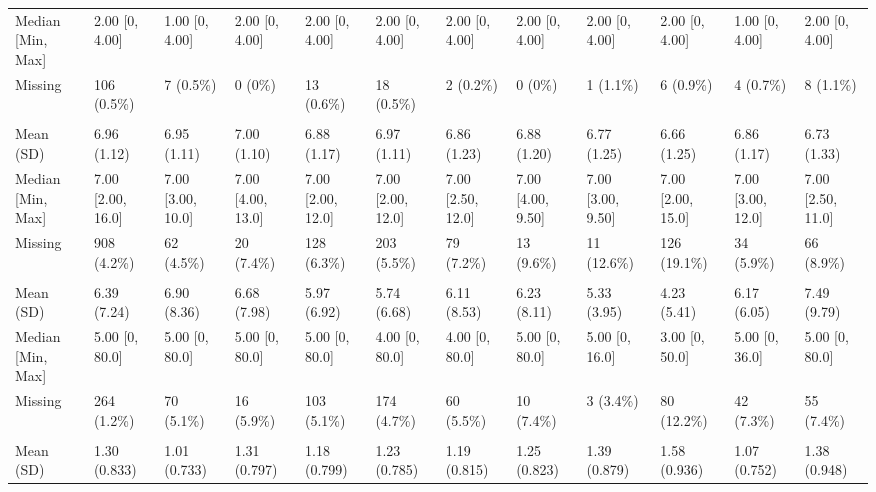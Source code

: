 \documentclass[
  single column]{article}
\begin{document}
\begin{landscape}
\begin{tabular}[t]{llllllllllll}
\hspace{1em}Median [Min, Max] & 2.00 [0, 4.00] & 1.00 [0, 4.00] & 2.00 [0, 4.00] & 2.00 [0, 4.00] & 2.00 [0, 4.00] & 2.00 [0, 4.00] & 2.00 [0, 4.00] & 2.00 [0, 4.00] & 2.00 [0, 4.00] & 1.00 [0, 4.00] & 2.00 [0, 4.00]\\
\hspace{1em}Missing & 106 (0.5\%) & 7 (0.5\%) & 0 (0\%) & 13 (0.6\%) & 18 (0.5\%) & 2 (0.2\%) & 0 (0\%) & 1 (1.1\%) & 6 (0.9\%) & 4 (0.7\%) & 8 (1.1\%)\\
\addlinespace[0.3em]
\multicolumn{12}{l}{\textbf{hlth\_sleep\_hours}}\\
\hspace{1em}Mean (SD) & 6.96 (1.12) & 6.95 (1.11) & 7.00 (1.10) & 6.88 (1.17) & 6.97 (1.11) & 6.86 (1.23) & 6.88 (1.20) & 6.77 (1.25) & 6.66 (1.25) & 6.86 (1.17) & 6.73 (1.33)\\
\hspace{1em}Median [Min, Max] & 7.00 [2.00, 16.0] & 7.00 [3.00, 10.0] & 7.00 [4.00, 13.0] & 7.00 [2.00, 12.0] & 7.00 [2.00, 12.0] & 7.00 [2.50, 12.0] & 7.00 [4.00, 9.50] & 7.00 [3.00, 9.50] & 7.00 [2.00, 15.0] & 7.00 [3.00, 12.0] & 7.00 [2.50, 11.0]\\
\hspace{1em}Missing & 908 (4.2\%) & 62 (4.5\%) & 20 (7.4\%) & 128 (6.3\%) & 203 (5.5\%) & 79 (7.2\%) & 13 (9.6\%) & 11 (12.6\%) & 126 (19.1\%) & 34 (5.9\%) & 66 (8.9\%)\\
\addlinespace[0.3em]
\multicolumn{12}{l}{\textbf{hours\_exercise}}\\
\hspace{1em}Mean (SD) & 6.39 (7.24) & 6.90 (8.36) & 6.68 (7.98) & 5.97 (6.92) & 5.74 (6.68) & 6.11 (8.53) & 6.23 (8.11) & 5.33 (3.95) & 4.23 (5.41) & 6.17 (6.05) & 7.49 (9.79)\\
\hspace{1em}Median [Min, Max] & 5.00 [0, 80.0] & 5.00 [0, 80.0] & 5.00 [0, 80.0] & 5.00 [0, 80.0] & 4.00 [0, 80.0] & 4.00 [0, 80.0] & 5.00 [0, 80.0] & 5.00 [0, 16.0] & 3.00 [0, 50.0] & 5.00 [0, 36.0] & 5.00 [0, 80.0]\\
\hspace{1em}Missing & 264 (1.2\%) & 70 (5.1\%) & 16 (5.9\%) & 103 (5.1\%) & 174 (4.7\%) & 60 (5.5\%) & 10 (7.4\%) & 3 (3.4\%) & 80 (12.2\%) & 42 (7.3\%) & 55 (7.4\%)\\
\addlinespace[0.3em]
\multicolumn{12}{l}{\textbf{kessler\_latent\_anxiety}}\\
\hspace{1em}Mean (SD) & 1.30 (0.833) & 1.01 (0.733) & 1.31 (0.797) & 1.18 (0.799) & 1.23 (0.785) & 1.19 (0.815) & 1.25 (0.823) & 1.39 (0.879) & 1.58 (0.936) & 1.07 (0.752) & 1.38 (0.948)\\

\end{tabular}
\end{landscape}
\end{document}
